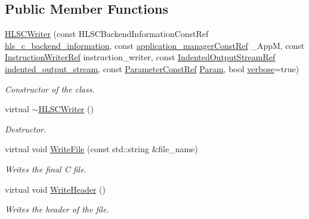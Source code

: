 \subsection*{Public Member Functions}
\begin{DoxyCompactItemize}
\item 
\hyperlink{classHLSCWriter_a03b5e7b5c529d4de7a9ffbdf6146a604}{H\+L\+S\+C\+Writer} (const H\+L\+S\+C\+Backend\+Information\+Const\+Ref \hyperlink{classHLSCWriter_a885e26e7963d6efaa29b0ab47864ab8b}{hls\+\_\+c\+\_\+backend\+\_\+information}, const \hyperlink{application__manager_8hpp_abb985163a2a3fb747f6f03b1eaadbb44}{application\+\_\+manager\+Const\+Ref} \+\_\+\+AppM, const \hyperlink{instruction__writer_8hpp_a40ea26c38a2909ba48f88f997144b260}{Instruction\+Writer\+Ref} instruction\+\_\+writer, const \hyperlink{indented__output__stream_8hpp_ab32278e11151ef292759c88e99b77feb}{Indented\+Output\+Stream\+Ref} \hyperlink{classCWriter_ac6d016436e065c31dd5152a7cc30e507}{indented\+\_\+output\+\_\+stream}, const \hyperlink{Parameter_8hpp_a37841774a6fcb479b597fdf8955eb4ea}{Parameter\+Const\+Ref} \hyperlink{classCWriter_a3555d61ac3540440862ed211800b80be}{Param}, bool \hyperlink{classCWriter_a8d5b6fe4a045d7e9ca997a566274cdb5}{verbose}=true)
\begin{DoxyCompactList}\small\item\em Constructor of the class. \end{DoxyCompactList}\item 
virtual \hyperlink{classHLSCWriter_aa59a87b90d09bd62acbf064d8378824c}{$\sim$\+H\+L\+S\+C\+Writer} ()
\begin{DoxyCompactList}\small\item\em Destructor. \end{DoxyCompactList}\item 
virtual void \hyperlink{classHLSCWriter_a5956dd91971c6fca646d0f714afd6795}{Write\+File} (const std\+::string \&file\+\_\+name)
\begin{DoxyCompactList}\small\item\em Writes the final C file. \end{DoxyCompactList}\item 
virtual void \hyperlink{classHLSCWriter_ac7015936ef0ed0f6c31f8d7d4c3bd7fa}{Write\+Header} ()
\begin{DoxyCompactList}\small\item\em Writes the header of the file. \end{DoxyCompactList}\end{DoxyCompactItemize}
